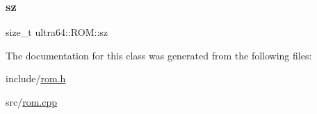 \mbox{\label{classultra64_1_1_r_o_m_a78f408d8ba2877e67d083268e912de18}} 
\subsubsection{\texorpdfstring{sz}{sz}}
{\footnotesize\ttfamily size\+\_\+t ultra64\+::\+R\+O\+M\+::sz\hspace{0.3cm}{\ttfamily [private]}}



The documentation for this class was generated from the following files\+:\begin{DoxyCompactItemize}
\item 
include/\hyperlink{rom_8h}{rom.\+h}\item 
src/\hyperlink{rom_8cpp}{rom.\+cpp}\end{DoxyCompactItemize}
